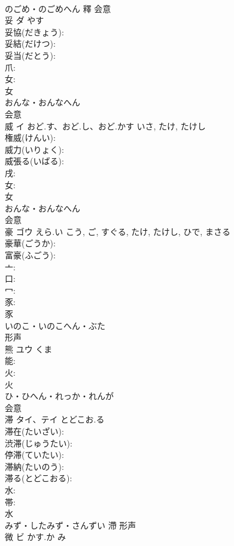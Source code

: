 \documentclass[8pt]{extreport}
\begin{document}
\begin{CJK}{UTF8}{min}
\\	のごめ・のごめへん	釋	会意 
\\	妥	ダ		やす	
\\	妥協(だきょう): 
\\	妥結(だけつ): 
\\	妥当(だとう): 
\\	爪: 
\\	女: 
\\	女	
\\	おんな・おんなへん	
\\	会意 
\\	威	イ	おど.す、おど.し、おど.かす	いさ, たけ, たけし	
\\	権威(けんい): 
\\	威力(いりょく): 
\\	威張る(いばる): 
\\	戌: 
\\	女: 
\\	女	
\\	おんな・おんなへん	
\\	会意 
\\	豪	ゴウ	えら.い	こう, ご, すぐる, たけ, たけし, ひで, まさる	
\\	豪華(ごうか): 
\\	富豪(ふごう): 
\\	亠: 
\\	口: 
\\	冖: 
\\	豕: 
\\	豕	
\\	いのこ・いのこへん・ぶた	
\\	形声 
\\	熊	ユウ	くま		
\\	能: 
\\	火: 
\\	火	
\\	ひ・ひへん・れっか・れんが	
\\	会意 
\\	滞	タイ、テイ	とどこお.る		
\\	滞在(たいざい): 
\\	渋滞(じゅうたい): 
\\	停滞(ていたい): 
\\	滞納(たいのう): 
\\	滞る(とどこおる): 
\\	水: 
\\	帯: 
\\	水	
\\	みず・したみず・さんずい	滯	形声 
\\	微	ビ	かす.か	み	

\end{CJK}
\end{document}
